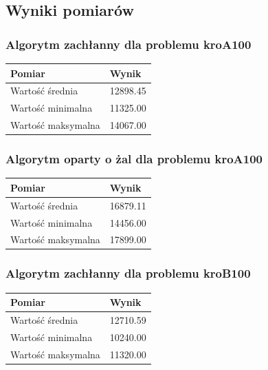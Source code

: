 \documentclass[a4paper]{article}
\begin{document}
\subsection{Wyniki pomiarów}

\subsubsection{Algorytm zachłanny dla problemu kroA100}

\begin{center}
	\begin{tabular}{ l | l }
		\textbf{Pomiar} & \textbf{Wynik} \\
		\hline
		Wartość średnia    & 12898.45 \\
		Wartość minimalna  & 11325.00 \\
		Wartość maksymalna & 14067.00 \\
	\end{tabular}
\end{center}

\subsubsection{Algorytm oparty o żal dla problemu kroA100}

\begin{center}
	\begin{tabular}{ l | l }
		\textbf{Pomiar} & \textbf{Wynik} \\
		\hline
		Wartość średnia    & 16879.11 \\
		Wartość minimalna  & 14456.00 \\
		Wartość maksymalna & 17899.00 \\
	\end{tabular}
\end{center}

\subsubsection{Algorytm zachłanny dla problemu kroB100}

\begin{center}
	\begin{tabular}{ l | l }
		\textbf{Pomiar} & \textbf{Wynik} \\
		\hline
		Wartość średnia    & 12710.59 \\
		Wartość minimalna  & 10240.00 \\
		Wartość maksymalna & 11320.00 \\
	\end{tabular}
\end{center}
\end{document}
